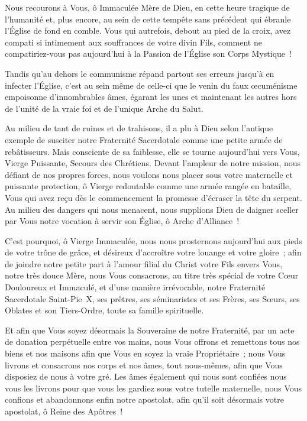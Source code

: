 \documentclass[%
a5paper%
,11pt%
,DIV=15%
,titlepage=on%
,headings=optiontoheadandtoc%
,headings=small%
,parskip=false%
,titlepage%
,openany%
]{scrbook}
\begin{document}
\begin{multicols}{2}
Nous recourons à Vous, ô Immaculée Mère de Dieu, en cette heure tragique de l’humanité et, plus encore, au sein de cette tempête sans précédent qui ébranle l’Église de fond en comble. Vous qui autrefois, debout au pied de la croix, avez compati si intimement aux souffrances de votre divin Fils, comment ne compatiriez-vous pas aujourd’hui à la Passion de l’Église son Corps Mystique !

Tandis qu’au dehors le communisme répand partout ses erreurs jusqu’à en infecter l’Église, c’est au sein même de celle-ci que le venin du faux œcuménisme empoisonne d’innombrables âmes, égarant les unes et maintenant les autres hors de l’unité de la vraie foi et de l’unique Arche du Salut.

Au milieu de tant de ruines et de trahisons, il a plu à Dieu selon l’antique exemple de susciter notre Fraternité Sacerdotale comme une petite armée de rebâtisseurs. Mais consciente de sa faiblesse, elle se tourne aujourd’hui vers Vous, Vierge Puissante, Secours des Chrétiens. Devant l’ampleur de notre mission, nous défiant de nos propres forces, nous voulons nous placer sous votre maternelle et puissante protection, ô Vierge redoutable comme une armée rangée en bataille, Vous qui avez reçu dès le commencement la promesse d’écraser la tête du serpent. Au milieu des dangers qui nous menacent, nous supplions Dieu de daigner sceller par Vous notre vocation à servir son Église, ô Arche d’Alliance !

C’est pourquoi, ô Vierge Immaculée, nous nous prosternons aujourd’hui aux pieds de votre trône de grâce, et désireux d’accroître votre louange et votre gloire ; afin de joindre notre petite part à l’amour filial du Christ votre Fils envers Vous, notre très douce Mère, nous Vous consacrons, au titre très spécial de votre Cœur Douloureux et Immaculé, et d’une manière irrévocable, notre Fraternité Sacerdotale Saint-Pie X, ses prêtres, ses séminaristes et ses Frères, ses Sœurs, ses Oblates et son Tiers-Ordre, toute sa famille spirituelle.

Et afin que Vous soyez désormais la Souveraine de notre Fraternité, par un acte de donation perpétuelle entre vos mains, nous Vous offrons et remettons tous nos biens et nos maisons afin que Vous en soyez la vraie Propriétaire ; nous Vous livrons et consacrons nos corps et nos âmes, tout nous-mêmes, afin que Vous disposiez de nous à votre gré. Les âmes également qui nous sont confiées nous vous les livrons pour que vous les gardiez sous votre tutelle maternelle, nous Vous confions et abandonnons enfin notre apostolat, afin qu’il soit désormais votre apostolat, ô Reine des Apôtres !


\end{multicols}
\end{document}
